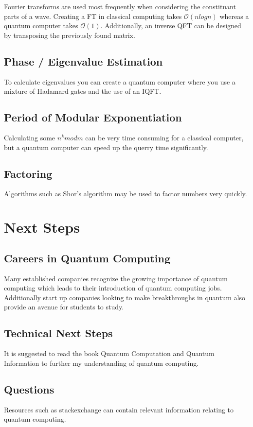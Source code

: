 \documentclass{article}
\begin{document}
Fourier transforms are used most frequently when considering the constituant parts of a wave. Creating a FT in classical computing takes $\mathcal{O}(nlogn)$ whereas a quantum computer takes $\mathcal{O}(1)$. Additionally, an inverse QFT can be designed by transposing the previously found matrix. 

\subsection{Phase / Eigenvalue Estimation}

To calculate eigenvalues you can create a quantum computer where you use a mixture of Hadamard gates and the use of an IQFT.\@

\subsection{Period of Modular Exponentiation}

Calculating some $n^k mod m$ can be very time consuming for a classical computer, but a quantum computer can speed up the querry time significantly.  

\subsection{Factoring}

Algorithms such as Shor's algorithm may be used to factor numbers very quickly.

\section{Next Steps} %

\subsection{Careers in Quantum Computing}

Many established companies recognize the growing importance of quantum computing which leads to their introduction of quantum computing jobs. Additionally start up companies looking to make breakthroughs in quantum also provide an avenue for students to study.

\subsection{Technical Next Steps}

It is suggested to read the book Quantum Computation and Quantum Information to further my understanding of quantum computing.

\subsection{Questions}

Resources such as stackexchange can contain relevant information relating to quantum computing.
\end{document}
